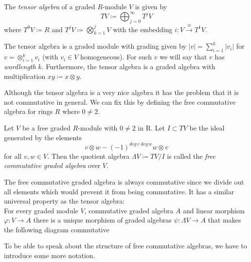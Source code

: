 \centerline{ 
}

\begin{Definition}
 The \emph{tensor algebra} of a graded $R$-module $V$ is given by
 $$ TV \coloneqq \bigoplus_{j = 0}^\infty T^j V$$
 where $T^0 V \coloneqq R$ and $T^j V \coloneqq \bigotimes_{k=1}^j V$ with the embedding 
 $i \colon V \overset{\cong}{\to} T^1 V$. 
 
 The tensor algebra is a graded module with grading given by
 $ |v| = \sum_{ i = 1}^k |v_i|$ for $ v = \otimes_{i = 1}^k v_i $ (with $v_i \in V$ homogeneous).
 For such $v$ we will say that $v$ has \emph{wordlength} $k$.
 Furthermore, the tensor algebra is a graded algebra with multiplication $xy \coloneqq x \otimes y$.
\end{Definition}

Although the tensor algebra is a very nice algebra it has the problem that it is not commutative in general. We can fix this by
defining the free commutative algebra for rings $R$ where $0 \neq 2$.

\begin{Definition}
 Let $V$ be a free graded $R$-module with $0 \neq 2$ in R. Let $I \subset TV$ be the ideal generated by the elements
 $$ v \otimes w - (-1)^{deg \, v \; deg \, w} w \otimes v$$
 for all $v,w \in V$. Then the quotient algebra $ \Lambda V \coloneqq TV/I$ is called the \emph{free commutative graded algebra} over $V$.
\end{Definition}

\begin{Remark}
 

The free commutative graded algebra is always commutative since we divide out all elements which would prevent it 
from being commutative. It has a similar universal property as the tensor algebra: \\ For every graded
module $V$, commutative graded algebra $A$ and linear morphism $\varphi \colon V \to A$ there is a unique morphism of
graded algebras $\psi \colon \Lambda V \to A$ that makes the following diagram commutative

 

\centerline{
}
\end{Remark}

To be able to speak about the structure of free commutative algebras, we have to introduce some more notation.

